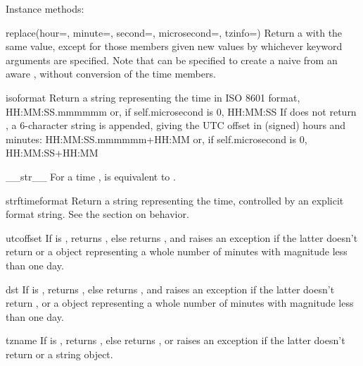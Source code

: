 Instance methods:

\begin{methoddesc}{replace}(hour=, minute=, second=, microsecond=, tzinfo=)
  Return a  with the same value, except for those members given
  new values by whichever keyword arguments are specified.  Note that
   can be specified to create a naive  from
  an aware , without conversion of the time members.
\end{methoddesc}

\begin{methoddesc}{isoformat}{}
  Return a string representing the time in ISO 8601 format,
      HH:MM:SS.mmmmmm
  or, if self.microsecond is 0,
      HH:MM:SS
  If  does not return , a 6-character
  string is appended, giving the UTC offset in (signed) hours and
  minutes:
      HH:MM:SS.mmmmmm+HH:MM
  or, if self.microsecond is 0,
      HH:MM:SS+HH:MM
\end{methoddesc}

\begin{methoddesc}{__str__}{}
  For a time ,  is equivalent to
  .
\end{methoddesc}

\begin{methoddesc}{strftime}{format}
  Return a string representing the time, controlled by an explicit
  format string.  See the section on  behavior.
\end{methoddesc}

\begin{methoddesc}{utcoffset}{}
  If  is , returns , else
  returns , and
  raises an exception if the latter doesn't return  or
  a  object representing a whole number of minutes
  with magnitude less than one day.
\end{methoddesc}

\begin{methoddesc}{dst}{}
  If  is , returns , else
  returns , and
  raises an exception if the latter doesn't return , or
  a  object representing a whole number of minutes
  with magnitude less than one day.
\end{methoddesc}

\begin{methoddesc}{tzname}{}
  If  is , returns , else
  returns , or
  raises an exception if the latter doesn't return  or
  a string object.
\end{methoddesc}


